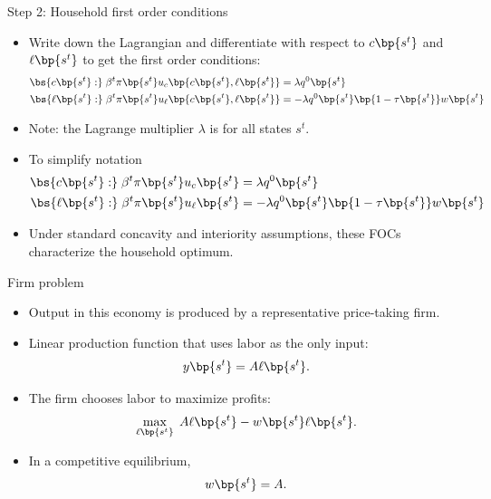 \documentclass[11pt,xcolor={dvipsnames},aspectratio=159,hyperref={pdftex,pdfpagemode=UseNone,hidelinks,pdfdisplaydoctitle=true},usepdftitle=false]{beamer}
\begin{document}
        
            \begin{frame}{Step 2: Household first order conditions}
            \begin{itemize}
            \item Write down the Lagrangian and differentiate with respect to $c\bp{s^t}$ and $\ell\bp{s^t}$ to get the first order conditions:
            \begin{align*}
            \bs{c\bp{s^t}:} \;\beta^t \pi\bp{s^t} u_c \bp{c \bp{s^t},\ell\bp{s^t}} & =\lambda q^0\bp{s^t}\\
            \bs{\ell\bp{s^t}:} \;\beta^t \pi\bp{s^t} u_{\ell} \bp{c \bp{s^t},\ell\bp{s^t}} & =-\lambda q^0\bp{s^t}\bp{1 - \tau\bp{s^t} }w \bp{s^t}
            \end{align*}
            \item Note: the Lagrange multiplier $\lambda$ is  for all states $s^t$.
            \item To simplify notation
            \begin{align*}
                \bs{c\bp{s^t}:} \;\beta^t \pi\bp{s^t} u_c \bp{s^t} & =\lambda q^0\bp{s^t}\\
                \bs{\ell\bp{s^t}:} \;\beta^t \pi\bp{s^t} u_{\ell} \bp{s^t} & =-\lambda q^0\bp{s^t}\bp{1 - \tau\bp{s^t} }w \bp{s^t}
                \end{align*}
            \item Under standard concavity and interiority assumptions, these FOCs characterize the household optimum.
            \end{itemize}
            \end{frame}

            \begin{frame}{Firm problem}
                \begin{itemize}
                    \item Output in this economy is produced by a representative price-taking firm.
                    \item Linear production function that uses labor as the only input:
                    \[
                        y\bp{s^t} = A\ell\bp{s^t}.
                    \]
                    \item The firm chooses labor to maximize profits:
                    \[
                        \max_{\ell\bp{s^t}}\; A\ell\bp{s^t} - w\bp{s^t} \ell \bp{s^t}.
                    \]
                    \item In a competitive equilibrium,
                    \[
                        w\bp{s^t} = A.
                    \]
                \end{itemize}
            \end{frame}
\end{document}
